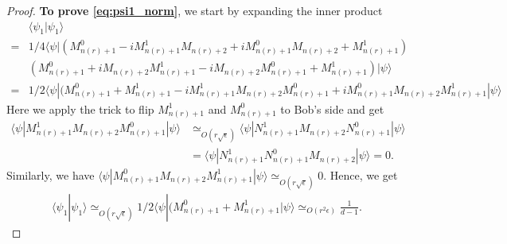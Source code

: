 \documentclass[11pt,letterpaper]{article}
\newcommand{\ket}[1]{|#1\rangle}
\newcommand{\bra}[1]{\langle#1|}
\newcommand{\braket}[2]{\langle#1|#2\rangle}
\DeclarePairedDelimiter{\norm}{\lVert}{\rVert}
\newcommand{\1}{\mathbb{1}}
\newcommand{\nr}{n(r)}
\newcommand{\ep}{\epsilon}
\newcommand{\se}{\sqrt{\epsilon}}
\newcommand{\sd}{\sqrt{d}}
\newcommand{\appd}[1]{\simeq_{#1}}
\theoremstyle{definition}
\begin{document}
\begin{proof}
    \textbf{To prove \cref{eq:psi1_norm}}, 
	we start by expanding the inner product
	\begin{align*}
		&\braket{\psi_1}{\psi_1} \\
		=&1/4\bra{\psi}(M_{\nr+1}^0 - iM_{\nr+1}^1M_{\nr+2} + iM_{\nr+1}^0M_{\nr+2} +M_{\nr+1}^1)\\
		&(M_{\nr+1}^0 + iM_{\nr+2}M_{\nr+1}^1 -iM_{\nr+2}M_{\nr+1}^0 + M_{\nr+1}^1)\ket{\psi}\\
		=&1/2\bra{\psi}(M_{\nr+1}^0+M_{\nr+1}^1-iM_{\nr+1}^1M_{\nr+2}M_{\nr+1}^0+iM_{\nr+1}^0M_{\nr+2}M_{\nr+1}^1\ket{\psi}
	\end{align*}
	Here we apply the trick to flip $M_{\nr+1}^1$ and $M_{\nr+1}^0$ to Bob's side and get 
	\begin{align*}
		\bra{\psi}M_{\nr+1}^1M_{\nr+2}M_{\nr+1}^0\ket{\psi} 
		&\appd{O(r\se)} \bra{\psi}N_{\nr+1}^1M_{\nr+2}N_{\nr+1}^0\ket{\psi} \\
		&= \bra{\psi}N_{\nr+1}^1N_{\nr+1}^0M_{\nr+2}\ket{\psi} = 0.
	\end{align*}
	Similarly, we have $\bra{\psi}M_{\nr+1}^0M_{\nr+2}M_{\nr+1}^1\ket{\psi} \appd{ O(r\se)} 0$.
	Hence, we get 
	\begin{align}
		\braket{\psi_1}{\psi_1} \appd{O(r\se)} 1/2\bra{\psi}(M_{\nr+1}^0+M_{\nr+1}^1\ket{\psi} \appd{O(r^2\ep)} 
		 \frac{1}{d-1}.
	\end{align}
	

\end{proof}
\end{document}
